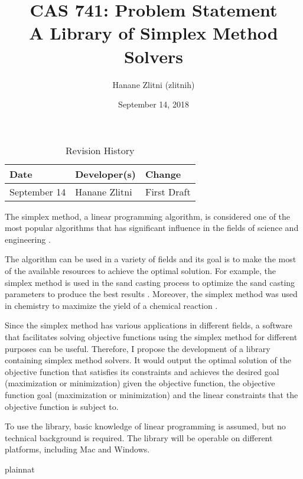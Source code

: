 \documentclass{article}
\title{CAS 741: Problem Statement\\A Library of Simplex Method Solvers}
\author{Hanane Zlitni (zlitnih)}
\date{September 14, 2018}
\begin{document}
\maketitle

\begin{table}[hp]
\caption{Revision History} \label{TblRevisionHistory}
\begin{tabularx}{\textwidth}{llX}
\toprule
\textbf{Date} & \textbf{Developer(s)} & \textbf{Change}\\
\midrule
September 14 & Hanane Zlitni & First Draft\\
\bottomrule
\end{tabularx}
\end{table}

The simplex method, a linear programming algorithm, is considered one of the 
most popular algorithms that has significant influence in the fields of science 
and engineering \cite{simplex-popularity}. 

The algorithm can be used in a variety of fields and its goal is to make the 
most of the available resources to achieve the optimal solution. For example, 
the simplex method is used in the sand casting process to optimize the sand 
casting parameters to produce the best results \cite{sand-casting}. Moreover, 
the simplex method was used in chemistry to maximize the yield of a chemical 
reaction \cite{chemistry}.

Since the simplex method has various applications in different fields, a 
software that facilitates solving objective functions using the simplex method 
for different purposes can be useful. Therefore, I propose the development of a 
library containing simplex method solvers. It would output the optimal solution 
of the objective function that satisfies its constraints and achieves the 
desired goal (maximization or minimization) given the objective function, the 
objective function goal (maximization or minimization) and the linear 
constraints that the objective function is subject to.

To use the library, basic knowledge of linear programming is assumed, but no 
technical background is required. The library will be operable on different 
platforms, including Mac and Windows.


 {plainnat}

\end{document}
